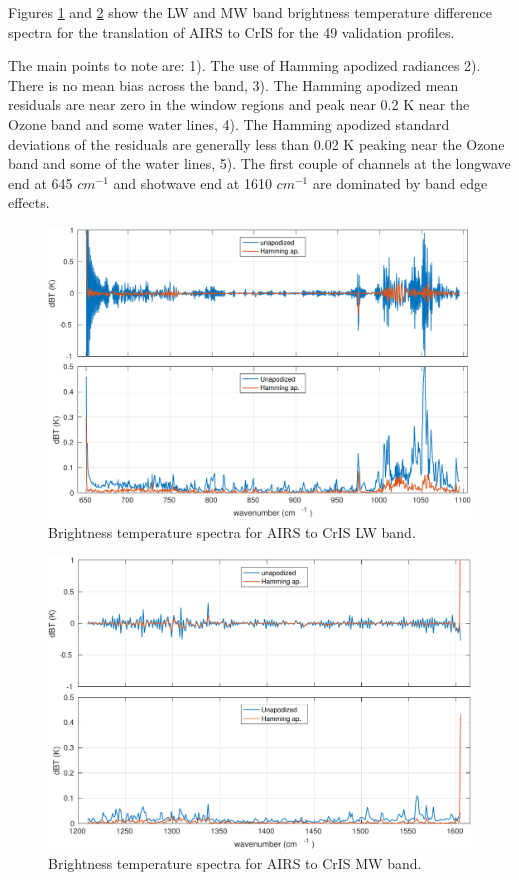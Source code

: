 \documentclass[twocolumn,10pt]{article}
\begin{document}
Figures \ref{fig:1a} and \ref{fig:1b} show the LW and MW band brightness temperature difference spectra for the translation of AIRS to CrIS for the 49 validation profiles.

The main points to note are: 1). The use of Hamming apodized radiances 2). There is no mean bias across the band, 3). The Hamming apodized mean residuals are near zero in the window regions and peak near 0.2 K near the Ozone band and some water lines, 4). The Hamming apodized standard deviations of the residuals are generally less than 0.02 K peaking near the Ozone band and some of the water lines, 5). The first couple of channels at the longwave end at 645 \(cm^{-1}\) and shotwave end at 1610 \(cm^{-1}\) are dominated by band edge effects.

\begin{figure}[htb]
\centering
\includegraphics[width=\linewidth]{./figs/airs2cris_vs_truth_LW.pdf}
\caption{\label{fig:orgparagraph1}
  Brightness temperature spectra for AIRS to CrIS LW band.}
\label{fig:1a}
\end{figure}

\begin{figure}[htb]
\centering
\includegraphics[width=\linewidth]{./figs/airs2cris_vs_truth_MW.pdf}
\caption{\label{fig:orgparagraph2}
  Brightness temperature spectra for AIRS to CrIS MW band.}
\label{fig:1b}
\end{figure}
\end{document}
